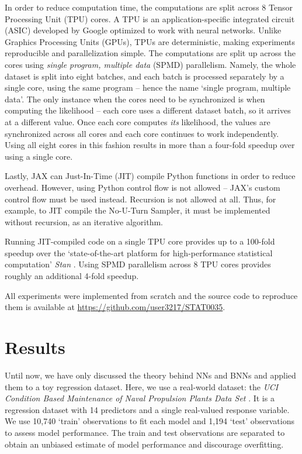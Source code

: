 \documentclass[12pt]{article}
\begin{document}
In order to reduce computation time, the computations are split across 8 Tensor Processing Unit (TPU) cores. A TPU is an application-specific integrated circuit (ASIC) developed by Google optimized to work with neural networks. Unlike Graphics Processing Units (GPUs), TPUs are deterministic, making experiments reproducible and parallelization simple. The computations are split up across the cores using \textit{single program, multiple data} (SPMD) parallelism. Namely, the whole dataset is split into eight batches, and each batch is processed separately by a single core, using the same program -- hence the name `single program, multiple data'. The only instance when the cores need to be synchronized is when computing the likelihood -- each core uses a different dataset batch, so it arrives at a different value. Once each core computes \textit{its} likelihood, the values are synchronized across all cores and each core continues to work independently. Using all eight cores in this fashion results in more than a four-fold speedup over using a single core. 

Lastly, JAX can Just-In-Time (JIT) compile Python functions in order to reduce overhead. However, using Python control flow is not allowed -- JAX's custom control flow must be used instead. Recursion is not allowed at all. Thus, for example, to JIT compile the No-U-Turn Sampler, it must be implemented without recursion, as an iterative algorithm.

Running JIT-compiled code on a single TPU core provides up to a 100-fold speedup over the `state-of-the-art platform for high-performance statistical computation' \textit{Stan} \cite{stan}. Using SPMD parallelism across 8 TPU cores provides roughly an additional 4-fold speedup.

All experiments were implemented from scratch and the source code to reproduce them is available at \url{https://github.com/user3217/STAT0035}.

\section{Results}
\label{sec_results}

Until now, we have only discussed the theory behind NNs and BNNs and applied them to a toy regression dataset. Here, we use a real-world dataset: the \textit{UCI Condition Based Maintenance of Naval Propulsion Plants Data Set} \cite{uci}. It is a regression dataset with 14 predictors and a single real-valued response variable. We use 10,740 `train' observations to fit each model and 1,194 `test' observations to assess model performance. The train and test observations are separated to obtain an unbiased estimate of model performance and discourage overfitting.
\end{document}
